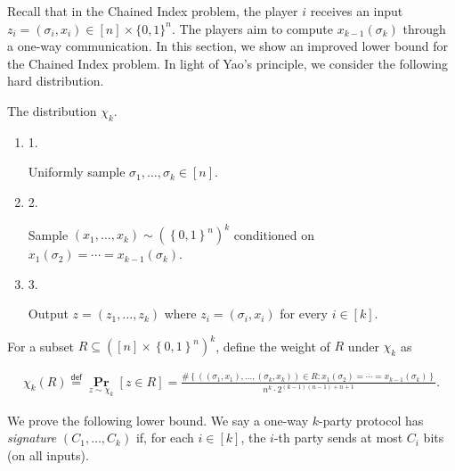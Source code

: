 \documentclass[10pt,a4paper]{article}
\begin{document}
Recall that in the Chained Index problem, the player $i$ receives an input $z_{i}=(\sigma_{i},x_{i})\in[n]\times\{0,1\}^{n}$. The players aim to compute $x_{k-1}(\sigma_{k})$ through a one-way communication. In this section, we show an improved lower bound for the Chained Index problem. In light of Yao’s principle, we consider the following hard distribution.\par



The distribution $\chi_{k}$.\par


\begin{enumerate}


\item[] 
1. 


Uniformly sample $\sigma_{1},...,\sigma_{k}\in[n]$.\par





\item[] 
2. 


Sample $(x_{1},\dots,x_{k})\sim(\left\{0,1\right\}^{n})^{k}$ conditioned on
$x_{1}(\sigma_{2})=\cdots=x_{k-1}(\sigma_{k})$.\par





\item[] 
3. 


Output $z=(z_{1},\dots,z_{k})$ where $z_{i}=(\sigma_{i},x_{i})$ for every $i\in[k]$.\par





\end{enumerate}



For a subset $R\subseteq([n]\times\left\{0,1\right\}^{n})^{k}$, define the weight of $R$ under $\chi_{k}$ as\par


\[\begin{gathered}
\chi_{k}(R)\stackrel{{\scriptstyle\mathsf{def}}}{{=}}\operatorname*{\mathbf{Pr}}_{z\sim\chi_{k}}\left[z\in R\right]=\frac{\#{\left\{((\sigma_{1},x_{1}),\dots,(\sigma_{k},x_{k}))\in R:x_{1}(\sigma_{2})=\cdots=x_{k-1}(\sigma_{k})\right\}}}{n^{k}\cdot 2^{(k-1)(n-1)+n+1}}.
\end{gathered}\]


We prove the following lower bound.
We say a one-way $k$-party protocol has \emph{signature} $(C_{1},\dots,C_{k})$ if, for each $i\in[k]$, the $i$-th party sends at most $C_{i}$ bits (on all inputs).\par
\end{document}
